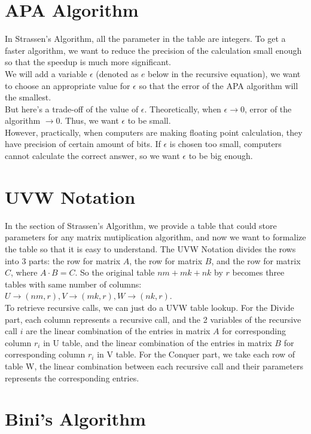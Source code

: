 \documentclass{article}
\begin{document}
\section{APA Algorithm}
In Strassen's Algorithm, all the parameter in the table are integers. To get a faster algorithm, we want to reduce the precision of the calculation small enough so that the speedup is much more significant.\\
We will add a variable $\epsilon$ (denoted as $e$ below in the recursive equation), we want to choose an appropriate value for $\epsilon$ so that the error of the APA algorithm will the smallest.\\
But here's a trade-off of the value of $\epsilon$. Theoretically, when $\epsilon \to 0$, error of the algorithm $\to 0$. Thus, we want $\epsilon$ to be small.\\
However, practically, when computers are making floating point calculation, they have precision of certain amount of bits. If $\epsilon$ is chosen too small, computers cannot calculate the correct answer, so we want $\epsilon$ to be big enough.

\section{UVW Notation}
In the section of Strassen's Algorithm, we provide a table that could store parameters for any matrix mutiplication algorithm,  and now we want to formalize the table so that it is easy to understand. The UVW Notation divides the rows into 3 parts: the row for matrix $A$, the row for matrix $B$, and the row for matrix $C$, where $A\cdot B = C$. So the original table $nm+mk+nk$ by $r$ becomes three tables with same number of columns: $U \rightarrow (nm,r), V\rightarrow(mk,r), W\rightarrow(nk,r)$.\\
To retrieve recursive calls, we can just do a UVW table lookup. For the Divide part, each column represents a recursive call, and the 2 variables of the recursive call $i$ are the linear combination of the entries in matrix $A$ for corresponding column $r_i$ in U table, and the linear combination of the entries in matrix $B$ for corresponding column $r_i$ in V table. For the Conquer part, we take each row of table W, the linear combination between each recursive call and their parameters represents the corresponding entries.


\section{Bini's Algorithm \cite{BCRL79}}
\end{document}
